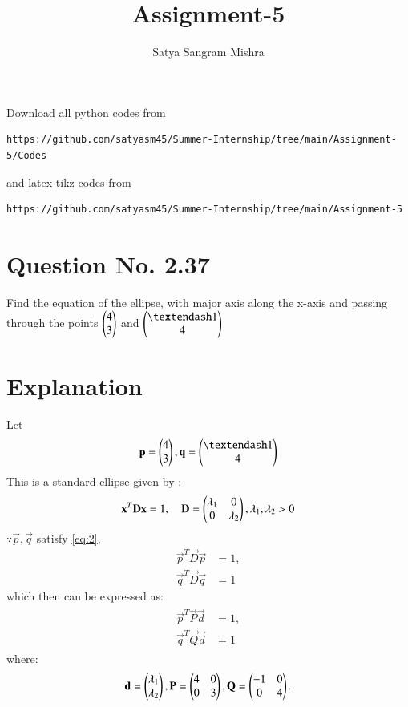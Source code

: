 \documentclass[journal,12pt,twocolumn]{IEEEtran}
\begin{document}
     \def\centbox#1{\makebox[0in]{#1}}
     \def\topbox#1{\raisebox{-\baselineskip}[0in][0in]{#1}}
     \def\midbox#1{\raisebox{-0.5\baselineskip}[0in][0in]{#1}}
\vspace{3cm}
\title{Assignment-5}
\author{Satya Sangram Mishra}
\maketitle
\newpage
\bigskip
\renewcommand{\thefigure}{\theenumi}
\renewcommand{\thetable}{\theenumi}
Download all python codes from 
\begin{lstlisting}
https://github.com/satyasm45/Summer-Internship/tree/main/Assignment-5/Codes
\end{lstlisting}
%
and latex-tikz codes from 
%
\begin{lstlisting}
https://github.com/satyasm45/Summer-Internship/tree/main/Assignment-5
\end{lstlisting}
%
\section{Question No. 2.37}
Find the equation of the ellipse, with major axis along the x-axis and passing through the points $\begin{pmatrix}4\\3\end{pmatrix}$  and $\myvec{– 1\\4}$ 
%
\section{Explanation}
Let 
\begin{align}
\vec{p} = \myvec{4\\3} , \vec{q} = \myvec{– 1\\4}
\end{align}
This is a standard ellipse given by :
\begin{align}
\label{eq:2}
\mathbf{x}^T\mathbf{D}\mathbf{x} = 1, \quad \mathbf{D} = \begin{pmatrix}\lambda_1 & 0 \\ 0 & \lambda_2\end{pmatrix}, \lambda_1,\lambda_2 > 0
\end{align}
$\because \vec{p}, \vec{q}$ satisfy \eqref{eq:2},
\begin{align}
\label{eq:ellipse_std_ab}
\vec{p}^T\vec{D}\vec{p} &= 1,
\\
\vec{q}^T\vec{D}\vec{q} &= 1
\end{align}
which then can be expressed as:
\begin{align}
\label{eq:5}
\begin{split}
\vec{p}^T\vec{P}\vec{d} &= 1,
\\
\vec{q}^T\vec{Q}\vec{d} &= 1
\end{split}
\end{align}
where:
\begin{align}
\mathbf{d} = \begin{pmatrix}\lambda_1\\ \lambda_2\end{pmatrix},
\mathbf{P} = \begin{pmatrix}4 & 0 \\ 0 & 3\end{pmatrix},
\mathbf{Q} = \begin{pmatrix}-1 & 0 \\ 0 & 4\end{pmatrix}.
\end{align}
\end{document}
